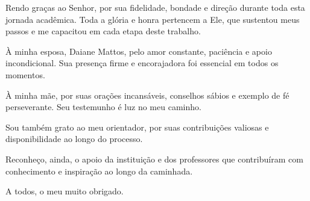 \begin{agradecimentos}
Rendo graças ao Senhor, por sua fidelidade, bondade e direção durante toda esta jornada acadêmica. Toda a glória e honra pertencem a Ele, que sustentou meus passos e me capacitou em cada etapa deste trabalho.

À minha esposa, Daiane Mattos, pelo amor constante, paciência e apoio incondicional. Sua presença firme e encorajadora foi essencial em todos os momentos.

À minha mãe, por suas orações incansáveis, conselhos sábios e exemplo de fé perseverante. Seu testemunho é luz no meu caminho.

Sou também grato ao meu orientador, por suas contribuições valiosas e disponibilidade ao longo do processo.

Reconheço, ainda, o apoio da instituição e dos professores que contribuíram com conhecimento e inspiração ao longo da caminhada.

A todos, o meu muito obrigado.
\end{agradecimentos}